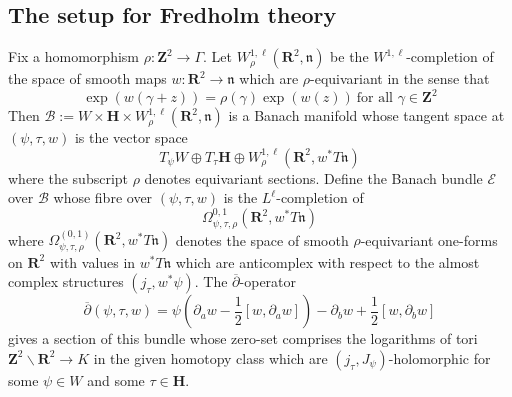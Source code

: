 \documentclass[11pt]{amsart}
\newcommand{\mB}{\mathcal{B}}
\newcommand{\mE}{\mathcal{E}}
\newcommand{\HH}{\mathbf{H}}
\newcommand{\RR}{\mathbf{R}}
\newcommand{\ZZ}{\mathbf{Z}}
\newcommand{\dbar}{\overline{\partial}}
\newcommand{\WW}{W}
\newcommand{\torus}{\ZZ^2\backslash\RR^2}
\newcommand{\nn}{\mathfrak{n}}
\numberwithin{equation}{section}
\theoremstyle{definition}
\theoremstyle{remark}
\begin{document}
\subsection{The setup for Fredholm theory}
Fix a homomorphism $\rho\colon\ZZ^2\to\Gamma$. Let $W^{1,\ell}_{\rho}(\RR^2,\nn)$ be the $W^{1,\ell}$-completion of the space of smooth maps $w\colon\RR^2\to\nn$ which are $\rho$-equivariant in the sense that
\[\exp(w(\gamma+z))=\rho(\gamma)\exp(w(z))\ \mbox{for all }\gamma\in\ZZ^2\]
Then $\mB:=\WW\times\HH\times W^{1,\ell}_{\rho}(\RR^2,\nn)$ is a Banach manifold whose tangent space at $(\psi,\tau,w)$ is the vector space
\[T_{\psi}\WW\oplus T_{\tau}\HH\oplus W^{1,\ell}_{\rho}(\RR^2,w^*T\nn)\]
where the subscript $\rho$ denotes equivariant sections. Define the Banach bundle $\mE$ over $\mB$ whose fibre over $(\psi,\tau,w)$ is the $L^\ell$-completion of
\[\Omega^{0,1}_{\psi,\tau,\rho}\left(\RR^2,w^*T\nn\right)\]
where $\Omega^{(0,1)}_{\psi,\tau,\rho}\left(\RR^2,w^*T\nn\right)$ denotes the space of smooth $\rho$-equivariant one-forms on $\RR^2$ with values in $w^*T\nn$ which are anticomplex with respect to the almost complex structures $(j_{\tau},w^*\psi)$. The $\dbar$-operator
\[\dbar(\psi,\tau,w)=\psi\left(\partial_aw-\frac{1}{2}[w,\partial_aw]\right)-\partial_bw+\frac{1}{2}[w,\partial_bw]\]
gives a section of this bundle whose zero-set comprises the logarithms of tori $\torus\to K$ in the given homotopy class which are $(j_{\tau},J_{\psi})$-holo\-mor\-phic for some $\psi\in\WW$ and some $\tau\in\HH$.
\end{document}
